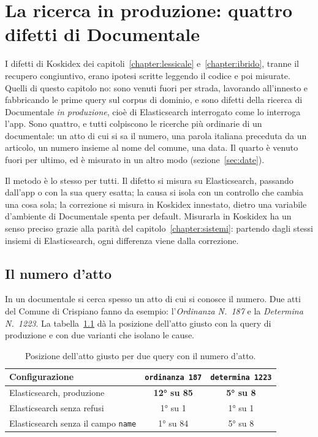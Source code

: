 \chapter{La ricerca in produzione: quattro difetti di Documentale}\label{chapter:produzione}

I difetti di Koskidex dei capitoli~\ref{chapter:lessicale} e~\ref{chapter:ibrido},
tranne il recupero congiuntivo, erano ipotesi scritte leggendo il codice e poi
misurate. Quelli di questo
capitolo no: sono venuti fuori per strada, lavorando all'innesto e fabbricando
le prime query sul corpus di dominio, e sono difetti della ricerca di Documentale
\emph{in produzione}, cioè di Elasticsearch interrogato come lo interroga l'app.
Sono quattro, e tutti colpiscono le ricerche più ordinarie di un documentale:
un atto di cui si sa il numero, una parola italiana preceduta da un articolo,
un numero insieme al nome del comune, una data. Il quarto è venuto fuori per
ultimo, ed è misurato in un altro modo (sezione~\ref{sec:date}).

Il metodo è lo stesso per tutti. Il difetto si misura su Elasticsearch, passando
dall'app o con la sua query esatta; la causa si isola con un controllo che cambia
una cosa sola; la correzione si misura in Koskidex innestato, dietro una variabile
d'ambiente di Documentale spenta per default. Misurarla in Koskidex ha un senso
preciso grazie alla parità del capitolo~\ref{chapter:sistemi}: partendo dagli
stessi insiemi di Elasticsearch, ogni differenza viene dalla correzione.

\section{Il numero d'atto}\label{sec:numero-atto}

In un documentale si cerca spesso un atto di cui si conosce il numero. Due atti
del Comune di Crispiano fanno da esempio: l'\emph{Ordinanza N.~187} e la
\emph{Determina N.~1223}. La tabella~\ref{tab:numero-atto} dà la posizione
dell'atto giusto con la query di produzione e con due varianti che isolano le
cause.

\begin{table}[ht]
  \centering
  \begin{tabular}{lcc}
    \toprule
    Configurazione & \texttt{ordinanza 187} & \texttt{determina 1223} \\
    \midrule
    Elasticsearch, produzione & \textbf{12° su 85} & \textbf{5° su 8} \\
    Elasticsearch senza refusi & 1° su 1 & 1° su 1 \\
    Elasticsearch senza il campo \texttt{name} & 1° su 84 & 5° su 8 \\
    \bottomrule
  \end{tabular}
  \caption{Posizione dell'atto giusto per due query con il numero d'atto.}
  \label{tab:numero-atto}
\end{table}

